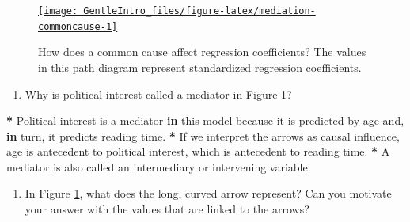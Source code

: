\documentclass[a4paper]{book}
\newenvironment{Shaded}{\begin{snugshade}}{\end{snugshade}}
\newcommand{\StringTok}[1]{\textcolor[rgb]{0.00,0.00,0.00}{#1}}
\newcommand{\ControlFlowTok}[1]{\textcolor[rgb]{0.00,0.00,0.00}{\textbf{#1}}}
\newcommand{\OperatorTok}[1]{\textcolor[rgb]{0.00,0.00,0.00}{\textbf{#1}}}
\newcommand{\NormalTok}[1]{#1}
\providecommand{\tightlist}{%
  \setlength{\itemsep}{0pt}\setlength{\parskip}{0pt}}
\theoremstyle{definition}
\theoremstyle{definition}
\theoremstyle{definition}
\theoremstyle{remark}
\begin{document}
\begin{figure}[H]
\href{http://82.196.4.233:3838/apps/mediation-commoncause/}{\texttt{[image: GentleIntro\_files/figure-latex/mediation-commoncause-1]} }\caption{How does a common cause affect regression coefficients? The values in this path diagram represent standardized regression coefficients.}\label{fig:mediation-commoncause}
\end{figure}

\begin{enumerate}
\def\labelenumi{\arabic{enumi}.}
\tightlist
\item
  Why is political interest called a mediator in Figure
  \ref{fig:mediation-commoncause}?
\end{enumerate}

\begin{Shaded}
\begin{Highlighting}[]
\OperatorTok{*}\StringTok{ }\NormalTok{Political interest is a mediator }\ControlFlowTok{in}\NormalTok{ this model because it is predicted by}
\NormalTok{age and, }\ControlFlowTok{in}\NormalTok{ turn, it predicts reading time.}
\OperatorTok{*}\StringTok{ }\NormalTok{If we interpret the arrows as causal influence, age is antecedent to}
\NormalTok{political interest, which is antecedent to reading time.}
\OperatorTok{*}\StringTok{ }\NormalTok{A mediator is also called an intermediary or intervening variable.}
\end{Highlighting}
\end{Shaded}

\begin{enumerate}
\def\labelenumi{\arabic{enumi}.}
\setcounter{enumi}{1}
\tightlist
\item
  In Figure \ref{fig:mediation-commoncause}, what does the long, curved
  arrow represent? Can you motivate your answer with the values that are
  linked to the arrows?
\end{enumerate}
\end{document}
